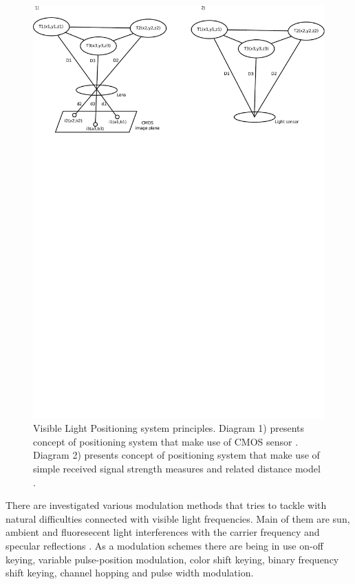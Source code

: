 \documentclass[../main.tex]{subfiles}
\begin{document}
\begin{figure}[!htbp]
\includegraphics[width=\textwidth, trim={0 20cm 0 0},clip]{pictures/visible_positioning.pdf}
\centering
\caption{Visible Light Positioning system principles. Diagram 1) presents concept of positioning system that make use of CMOS sensor  \cite{visible_light_positioning}. Diagram 2) presents concept of positioning system that make use of simple received signal strength measures and related distance model \cite{visible_light_positioning_epsilon}.}
\label{fig:visible_positioning}
\end{figure}

There are investigated various modulation methods that tries to tackle with natural difficulties connected with visible light frequencies. Main of them are sun, ambient and fluoresecent light interferences with the carrier frequency and specular reflections \cite{visible_light_positioning}. As a modulation schemes there are being in use on-off keying, variable pulse-position modulation, color shift keying, binary frequency shift keying, channel hopping and pulse width modulation.
\end{document}
